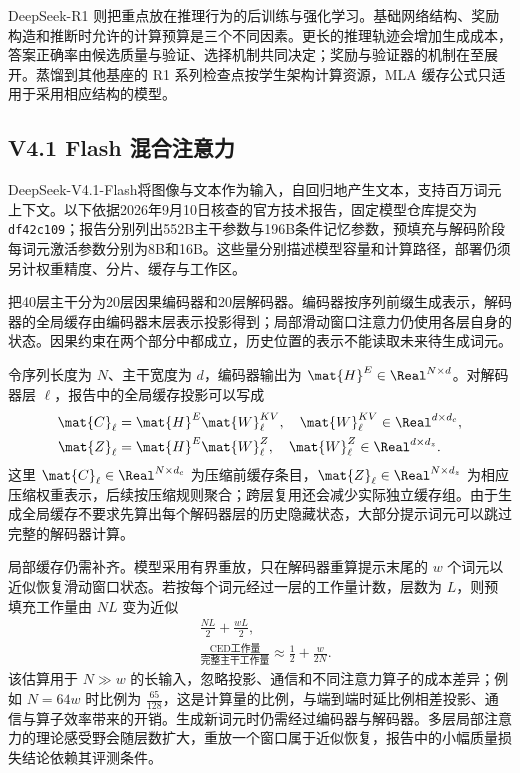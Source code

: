 \documentclass[../textbook.tex]{subfiles}
\begin{document}
DeepSeek-R1 则把重点放在推理行为的后训练与强化学习\cite{deepseek2025r1}。基础网络结构、奖励构造和推断时允许的计算预算是三个不同因素。更长的推理轨迹会增加生成成本，答案正确率由候选质量与验证、选择机制共同决定；奖励与验证器的机制在至展开。蒸馏到其他基座的 R1 系列检查点按学生架构计算资源，MLA 缓存公式只适用于采用相应结构的模型。

\subsection{V4.1 Flash 混合注意力}
DeepSeek-V4.1-Flash将图像与文本作为输入，自回归地产生文本，支持百万词元上下文。以下依据2026年9月10日核查的官方技术报告，固定模型仓库提交为\texttt{df42c109}；报告分别列出552B主干参数与196B条件记忆参数，预填充与解码阶段每词元激活参数分别为8B和16B\cite{deepseek2026v41flash}。这些量分别描述模型容量和计算路径，部署仍须另计权重精度、分片、缓存与工作区。

把40层主干分为20层因果编码器和20层解码器。编码器按序列前缀生成表示，解码器的全局缓存由编码器末层表示投影得到；局部滑动窗口注意力仍使用各层自身的状态。因果约束在两个部分中都成立，历史位置的表示不能读取未来待生成词元。

令序列长度为 $N$、主干宽度为 $d$，编码器输出为 $\mat{H}^E\in\Real^{N\times d}$。对解码器层 $\ell$，报告中的全局缓存投影可以写成
\begin{equation}
 \begin{aligned}
  \mat{C}_\ell &= \mat{H}^E \mat{W}^{KV}_\ell, \quad \mat{W}^{KV}_\ell\in\Real^{d\times d_c}, \\
  \mat{Z}_\ell &= \mat{H}^E \mat{W}^Z_\ell, \quad \mat{W}^Z_\ell\in\Real^{d\times d_z}.
 \end{aligned}
\end{equation}
这里 $\mat{C}_\ell\in\Real^{N\times d_c}$ 为压缩前缓存条目，$\mat{Z}_\ell\in\Real^{N\times d_z}$ 为相应压缩权重表示，后续按压缩规则聚合；跨层复用还会减少实际独立缓存组。由于生成全局缓存不要求先算出每个解码器层的历史隐藏状态，大部分提示词元可以跳过完整的解码器计算。

局部缓存仍需补齐。模型采用有界重放，只在解码器重算提示末尾的 $w$ 个词元以近似恢复滑动窗口状态。若按每个词元经过一层的工作量计数，层数为 $L$，则预填充工作量由 $NL$ 变为近似
\begin{equation}
 \begin{aligned}
  &\frac{NL}{2}+\frac{wL}{2}, \\
  &\frac{\text{CED工作量}}{\text{完整主干工作量}}
  \approx\frac{1}{2}+\frac{w}{2N}.
 \end{aligned}
\end{equation}
该估算用于 $N\gg w$ 的长输入，忽略投影、通信和不同注意力算子的成本差异；例如 $N=64w$ 时比例为 $\frac{65}{128}$，这是计算量的比例，与端到端时延比例相差投影、通信与算子效率带来的开销。生成新词元时仍需经过编码器与解码器。多层局部注意力的理论感受野会随层数扩大，重放一个窗口属于近似恢复，报告中的小幅质量损失结论依赖其评测条件\cite{deepseek2026v41flash}。
\end{document}

